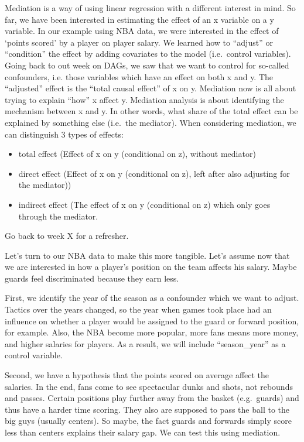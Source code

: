 \documentclass[
]{book}
\providecommand{\tightlist}{%
  \setlength{\itemsep}{0pt}\setlength{\parskip}{0pt}}
\begin{document}
Mediation is a way of using linear regression with a different interest in mind.
So far, we have been interested in estimating the effect of an x variable on a
y variable. In our example using NBA data, we were interested in the effect of
`points scored' by a player on player salary. We learned how to ``adjust'' or ``condition''
the effect by adding covariates to the model (i.e.~control variables). Going back to
out week on DAGs, we saw that we want to control for so-called confounders, i.e.
those variables which have an effect on both x and y. The ``adjusted'' effect is the
``total causal effect'' of x on y.
Mediation now is all about trying to explain ``how'' x affect y. Mediation analysis
is about identifying the mechanism between x and y. In other words, what share
of the total effect can be explained by something else (i.e.~the mediator). When
considering mediation, we can distinguish 3 types of effects:

\begin{itemize}
\tightlist
\item
  total effect (Effect of x on y (conditional on z), without mediator)
\item
  direct effect (Effect of x on y (conditional on z), left after also adjusting for the mediator))
\item
  indirect effect (The effect of x on y (conditional on z) which only goes through the mediator.
\end{itemize}

Go back to week X for a refresher.

Let's turn to our NBA data to make this more tangible. Let's assume now that we are interested in how a player's position on the team affects his salary. Maybe guards feel
discriminated because they earn less.

First, we identify the year of the season as a confounder which we want to adjust.
Tactics over the years changed, so the year when games took place had an influence on
whether a player would be assigned to the guard or forward position, for example.
Also, the NBA become more popular, more fans means more money, and higher salaries
for players. As a result, we will include ``season\_year'' as a control variable.

Second, we have a hypothesis that the points scored on average affect the salaries.
In the end, fans come to see spectacular dunks and shots, not rebounds and passes.
Certain positions play further away from the basket (e.g.~guards) and thus have a harder time scoring. They also are supposed to pass the ball to the big guys (usually centers).
So maybe, the fact guards and forwards simply score less than centers explains their salary gap. We can test this using mediation.
\end{document}

